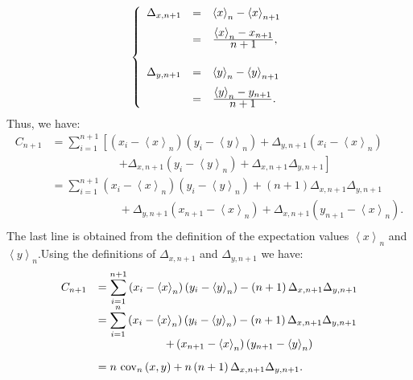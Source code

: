 \documentclass[twoside]{book}
\begin{document}
\begin{equation}
 \left\{
 \begin{array}{lcl}
   \Delta_{x,n+1}&=&\left\langle x\right\rangle_n-\left\langle
   x\right\rangle_{n+1}\\[1.5ex]
   &=&{\displaystyle\left\langle x\right\rangle_n-x_{n+1}\over\displaystyle
   n+1},\\[4ex]
   \Delta_{y,n+1}&=&\left\langle y\right\rangle_n-\left\langle
   y\right\rangle_{n+1}\\[1.5ex]
   &=&{\displaystyle\left\langle y\right\rangle_n-y_{n+1}\over\displaystyle
   n+1}.\\
 \end{array}
 \right.
\end{equation}
Thus, we have:
\begin{equation}
  \begin{array}{ll}
 C_{n+1}&=\displaystyle\sum_{i=1}^{n+1}\left[\left(x_i-\left\langle
   x\right\rangle_n\right)\left(y_i-\left\langle
   y\right\rangle_n\right)+\Delta_{y,n+1}\left(x_i-\left\langle
   x\right\rangle_n\right)\right.\\
   &\qquad\qquad\qquad\left.+\Delta_{x,n+1}\left(y_i-\left\langle
   y\right\rangle_n\right)+\Delta_{x,n+1}\Delta_{y,n+1}\right]\\
   &=\displaystyle\sum_{i=1}^{n+1}\left(x_i-\left\langle
   x\right\rangle_n\right)\left(y_i-\left\langle
   y\right\rangle_n\right)+\left(n+1\right)\Delta_{x,n+1}\Delta_{y,n+1}\\
   &\qquad\qquad\qquad+\Delta_{y,n+1}\left(x_{n+1}-\left\langle
   x\right\rangle_n\right)+\Delta_{x,n+1}\left(y_{n+1}-\left\langle
   x\right\rangle_n\right).\\
 \end{array}
\end{equation}
The last line is obtained from the definition of the expectation
values $\left\langle x\right\rangle_n$ and $\left\langle
y\right\rangle_n$.Using the definitions of $\Delta_{x,n+1}$ and
$\Delta_{y,n+1}$ we have:
\begin{equation}
  \begin{array}{ll}
 C_{n+1}&=\displaystyle\sum_{i=1}^{n+1}\left(x_i-\left\langle
   x\right\rangle_n\right)\left(y_i-\left\langle
   y\right\rangle_n\right)-\left(n+1\right)\Delta_{x,n+1}\Delta_{y,n+1}\\
   &=\displaystyle\sum_{i=1}^{n}\left(x_i-\left\langle
   x\right\rangle_n\right)\left(y_i-\left\langle
   y\right\rangle_n\right)-\left(n+1\right)\Delta_{x,n+1}\Delta_{y,n+1}\\
   &\qquad\qquad\qquad+\left(x_{n+1}-\left\langle
   x\right\rangle_n\right)\left(y_{n+1}-\left\langle
   y\right\rangle_n\right)\\[2ex]
   &=n\ {\cov}_n\left(x,y\right)+n\left(n+1\right)\Delta_{x,n+1}\Delta_{y,n+1}.\\
  \end{array}
\end{equation}
\end{document}
